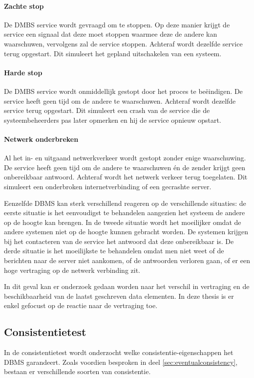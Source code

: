 \paragraph{Zachte stop} De DMBS service wordt gevraagd om te stoppen. Op deze manier krijgt de service een signaal dat deze moet stoppen waarmee deze de andere kan waarschuwen, vervolgens zal de service stoppen. Achteraf wordt dezelfde service terug opgestart. Dit simuleert het gepland uitschakelen van een systeem. 

\paragraph{Harde stop} De DMBS service wordt onmiddellijk gestopt door het proces te beëindigen. De service heeft geen tijd om de andere te waarschuwen. Achteraf wordt dezelfde service terug opgestart. Dit simuleert een crash van de service die de systeembeheerders pas later opmerken en hij de service opnieuw opstart. 

\paragraph{Netwerk onderbreken} Al het in- en uitgaand netwerkverkeer wordt gestopt zonder enige waarschuwing. De service heeft geen tijd om de andere te waarschuwen én de zender krijgt geen onbereikbaar antwoord. Achteraf wordt het netwerk verkeer terug toegelaten. Dit simuleert een onderbroken internetverbinding of een gecrashte server.  

Eenzelfde DBMS kan sterk verschillend reageren op de verschillende situaties: de eerste situatie is het eenvoudigst te behandelen aangezien het systeem de andere op de hoogte kan brengen. In de tweede situatie wordt het moeilijker omdat de andere systemen niet op de hoogte kunnen gebracht worden. De systemen krijgen bij het contacteren van de service het antwoord dat deze onbereikbaar is. De derde situatie is het moeilijkste te behandelen omdat men niet weet of de berichten naar de server niet aankomen, of de antwoorden verloren gaan, of er een hoge vertraging op de netwerk verbinding zit. 

In dit geval kan er onderzoek gedaan worden naar het verschil in vertraging en de beschikbaarheid van de laatst geschreven data elementen. In deze thesis is er enkel gefocust op de reactie naar de vertraging toe. 
 
\subsection{Consistentietest}
In de consistentietest wordt onderzocht welke consistentie-eigenschappen het DBMS garandeert. Zoals voordien besproken in deel \ref{sec:eventualconsistency}, bestaan er verschillende soorten van consistentie. 


